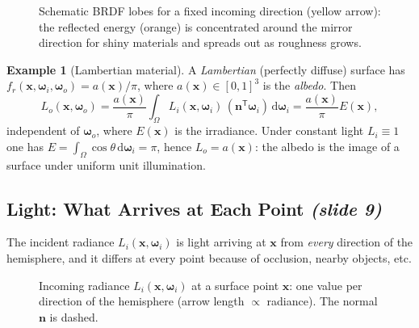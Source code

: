 \documentclass[11pt,a4paper]{article}
\theoremstyle{definition}
\newtheorem{example}[definition]{Example}
\theoremstyle{plain}
\theoremstyle{remark}
\newcommand{\slideone}[1]{\texorpdfstring{\emph{(slide #1)}}{(slide #1)}}
\newcommand{\x}{{\bm{x}}}
\newcommand{\n}{{\bm{n}}}
\newcommand{\wi}{{\bm{\omega}_i}}
\newcommand{\wo}{{\bm{\omega}_o}}
\newcommand{\fr}{f_r}
\newcommand{\Lo}{L_o}
\newcommand{\Li}{L_i}
\begin{document}
\begin{figure}[!htbp]\centering
{}
\caption{Schematic BRDF lobes for a fixed incoming direction (yellow arrow): the reflected energy (orange) is concentrated around the mirror direction for shiny materials and spreads out as roughness grows.}
\label{fig:lobes}
\end{figure}

\begin{example}[Lambertian material]
A \emph{Lambertian} (perfectly diffuse) surface has $\fr(\x,\wi,\wo)=a(\x)/\pi$, where $a(\x)\in[0,1]^3$ is the \emph{albedo}. Then
\[
 \Lo(\x,\wo)=\frac{a(\x)}{\pi}\int_\Omega \Li(\x,\wi)\,(\n^{\mathsf T}\wi)\,\mathrm d\wi=\frac{a(\x)}{\pi}E(\x),
\]
independent of $\wo$, where $E(\x)$ is the irradiance. Under constant light $\Li\equiv 1$ one has $E=\int_\Omega \cos\theta\,\mathrm d\wi=\pi$, hence $\Lo=a(\x)$: the albedo is the image of a surface under uniform unit illumination.
\end{example}

\subsection{Light: What Arrives at Each Point \slideone{9}}

The incident radiance $\Li(\x,\wi)$ is light arriving at $\x$ from \emph{every} direction of the hemisphere, and it differs at every point because of occlusion, nearby objects, etc.

\begin{figure}[!htbp]\centering
{}
\caption{Incoming radiance $\Li(\x,\wi)$ at a surface point $\x$: one value per direction of the hemisphere (arrow length $\propto$ radiance). The normal $\n$ is dashed.}
\end{figure}
\end{document}
